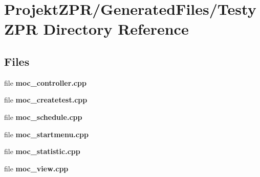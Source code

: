 \section{Projekt\-Z\-P\-R/\-Generated\-Files/\-Testy\-Z\-P\-R Directory Reference}
\label{dir_34c7438852c6190db27668d424c7dac3}
\subsection*{Files}
\begin{DoxyCompactItemize}
\item 
file {\bf moc\-\_\-controller.\-cpp}
\item 
file {\bf moc\-\_\-createtest.\-cpp}
\item 
file {\bf moc\-\_\-schedule.\-cpp}
\item 
file {\bf moc\-\_\-startmenu.\-cpp}
\item 
file {\bf moc\-\_\-statistic.\-cpp}
\item 
file {\bf moc\-\_\-view.\-cpp}
\end{DoxyCompactItemize}
